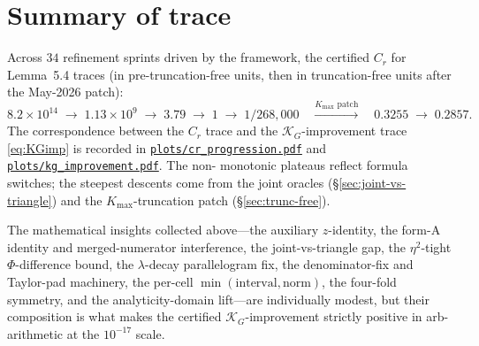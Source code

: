 \documentclass[11pt]{article}
\theoremstyle{definition}
\newcommand{\KG}{\mathcal{K}_G}
\begin{document}
\bigskip

\section{Summary of trace}

Across $34$ refinement sprints driven by the framework, the certified $C_r$ for
Lemma~5.4 traces (in pre-truncation-free units, then in truncation-free units after
the May-2026 patch):
\[
   8.2\!\times\!10^{14}
   \;\to\;
   1.13\!\times\!10^{9}
   \;\to\;
   3.79
   \;\to\;
   1
   \;\to\;
   1/268{,}000\quad
   \xrightarrow{\text{$K_{\max}$ patch}}\quad
   0.3255
   \;\to\;
   0.2857.
\]
The correspondence between the $C_r$ trace and the $\KG$-improvement trace
\eqref{eq:KGimp} is recorded in
\href{run:plots/cr_progression.pdf}{\texttt{plots/cr\_progression.pdf}} and
\href{run:plots/kg_improvement.pdf}{\texttt{plots/kg\_improvement.pdf}}. The non-
monotonic plateaus reflect formula switches; the steepest descents come from the joint
oracles (\S\ref{sec:joint-vs-triangle}) and the $K_{\max}$-truncation patch
(\S\ref{sec:trunc-free}).

The mathematical insights collected above---the auxiliary $z$-identity, the form-A
identity and merged-numerator interference, the joint-vs-triangle gap, the
$\eta^2$-tight $\Phi$-difference bound, the $\lambda$-decay parallelogram fix, the
denominator-fix and Taylor-pad machinery, the per-cell $\min(\text{interval},\text{norm})$,
the four-fold symmetry, and the analyticity-domain lift---are individually
modest, but their composition is what makes the certified $\KG$-improvement strictly
positive in arb-arithmetic at the $10^{-17}$ scale.
\end{document}
